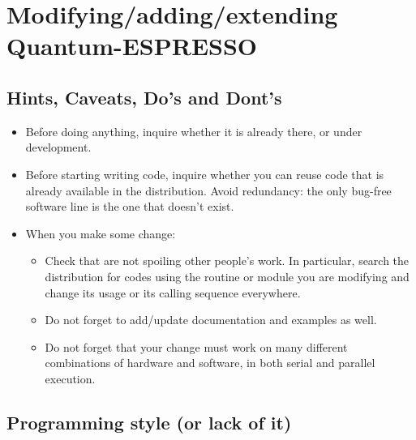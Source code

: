 \documentclass[12pt,a4paper]{article}
\begin{document}
\section{Modifying/adding/extending Quantum-ESPRESSO}
\subsection{Hints, Caveats, Do's and Dont's}
\begin{itemize}
\item
Before doing anything, inquire whether it is already there,
or under development.
\item 
Before starting writing code, inquire whether you can reuse
code that is already available in the distribution. Avoid 
redundancy: the only bug-free software line is the one that 
doesn't exist.
\item When you make some change:
\begin{itemize}
\item Check that are not spoiling other people's work.
In particular, search the distribution for codes using the routine 
or module you are modifying and change its usage or its calling 
sequence everywhere.
\item Do not forget to add/update documentation and examples as well.
\item Do not forget that your change must work on many different 
combinations of hardware and software, in both serial and parallel
execution.
\end{itemize}
\end{itemize}
\subsection{Programming style (or lack of it)}
\end{document}
